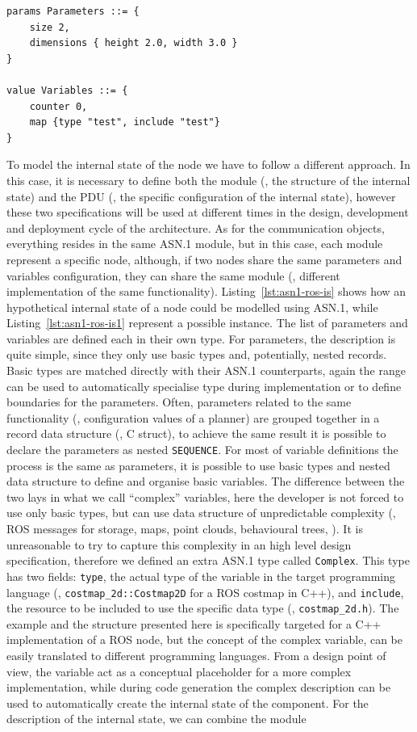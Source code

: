 \begin{lstlisting}[float,caption={TODO},label=lst:asn1-ros-is1]
params Parameters ::= {
	size 2, 
	dimensions { height 2.0, width 3.0 }
}

value Variables ::= { 
	counter 0,
	map {type "test", include "test"}
}
\end{lstlisting}

To model the internal state of the node we have to follow a different approach. In this case, it is necessary to define both the module (\ie, the structure of the internal state) and the PDU (\ie, the specific configuration of the internal state), however these two specifications will be used at different times in the design, development and deployment cycle of the architecture. As for the communication objects, everything resides in the same ASN.1 module, but in this case, each module represent a specific node, although, if two nodes share the same parameters and variables configuration, they can share the same module (\eg, different implementation of the same functionality). Listing~\ref{lst:asn1-ros-is} shows how an hypothetical internal state of a node could be modelled using ASN.1, while Listing~\ref{lst:asn1-ros-is1} represent a possible instance. The list of parameters and variables are defined each in their own type. For parameters, the description is quite simple, since they only use basic types and, potentially, nested records. Basic types are matched directly with their ASN.1 counterparts, again the range can be used to automatically specialise type during implementation or to define boundaries for the parameters. Often, parameters related to the same functionality (\eg, configuration values of a planner) are grouped together in a record data structure (\eg, C struct), to achieve the same result it is possible to declare the parameters as nested \texttt{SEQUENCE}. For most of variable definitions the process is the same as parameters, it is possible to use basic types and nested data structure to define and organise basic variables. The difference between the two lays in what we call ``complex'' variables, here the developer is not forced to use only basic types, but can use data structure of unpredictable complexity (\eg, ROS messages for storage, maps, point clouds, behavioural trees, \etc). It is unreasonable to try to capture this complexity in an high level design specification, therefore we defined an extra ASN.1 type called \texttt{Complex}. This type has two fields: \texttt{type}, the actual type of the variable in the target programming language (\eg, \texttt{costmap\_2d::Costmap2D} for a ROS costmap in C++), and \texttt{include}, the resource to be included to use the specific data type (\eg, \texttt{costmap\_2d.h}). The example and the structure presented here is specifically targeted for a C++ implementation of a ROS node, but the concept of the complex variable, can be easily translated to different programming languages. From a design point of view, the variable act as a conceptual placeholder for a more complex implementation, while during code generation the complex description can be used to automatically create the internal state of the component. For the description of the internal state, we can combine the module 